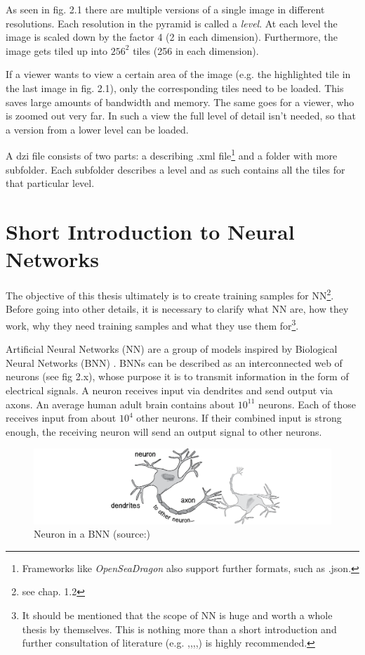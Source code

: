 As seen in fig. 2.1 there are multiple versions of a single image in different resolutions. Each resolution in the pyramid is called a \emph{level}. At each level the image is scaled down by the factor 4 (2 in each dimension). Furthermore, the image gets tiled up into $256^2$ tiles (256 in each dimension)\cite{web:dzi}.

If a viewer wants to view a certain area of the image (e.g. the highlighted tile in the last image in fig. 2.1), only the corresponding tiles need to be loaded. This saves large amounts of bandwidth and memory. The same goes for a viewer, who is zoomed out very far. In such a view the full level of detail isn't needed, so that a version from a lower level can be loaded.

A dzi file consists of two parts: a describing .xml file\footnote{Frameworks like \emph{OpenSeaDragon} also support further formats, such as .json.} and a folder with more subfolder. Each subfolder describes a level and as such contains all the tiles for that particular level.


\section{Short Introduction to Neural Networks}
The objective of this thesis ultimately is to create training samples for NN\footnote{see chap. 1.2}. Before going into other details, it is necessary to clarify what NN are, how they work, why they need training samples and what they use them for\footnote{It should be mentioned that the scope of NN is huge and worth a whole thesis by themselves. This is nothing more than a short introduction and further consultation of literature (e.g. \cite{Stergiou96},\cite{Bourg04},\cite{Egmont-Petersen02},\cite{Kriesel07},\cite{Shiffman12}) is highly recommended.}.

Artificial Neural Networks (NN) are a group of models inspired by Biological Neural Networks (BNN) . BNNs can be described as an interconnected web of neurons (see fig 2.x), whose purpose it is to transmit information in the form of electrical signals. A neuron receives input via dendrites and send output via axons\cite{Shiffman12}. An average human adult brain contains about $10^{11}$ neurons. Each of those receives input from about $10^4$ other neurons. If their combined input is strong enough, the receiving neuron will send an output signal to other neurons\cite{Bourg04}.

\begin{figure}[H]
	\begin{center}
		\includegraphics[scale=0.7]{img/bnn.png}
		\caption{Neuron in a BNN (source:\cite{Shiffman12})}
		\label{fig:fig2.2}
	\end{center}
\end{figure}

